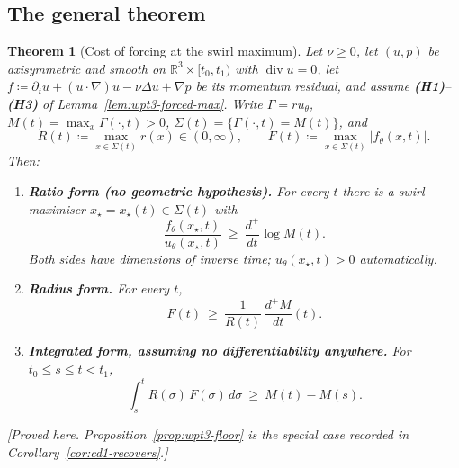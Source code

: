 \documentclass[11pt]{article}
\newtheorem{theorem}{Theorem}[section]
\theoremstyle{definition}
\theoremstyle{remark}
\newcommand{\R}{\mathbb{R}}
\newcommand{\abs}[1]{\left|#1\right|}
\newcommand{\grad}{\nabla}
\newcommand{\divg}{\operatorname{div}}
\begin{document}
\subsection{The general theorem}
\label{subsec:cd1-theorem}

\begin{theorem}[Cost of forcing at the swirl maximum]
  \label{thm:cd1-general-floor}
  Let $\nu\geq0$, let $(u,p)$ be axisymmetric and smooth on
  $\R^3\times[t_0,t_1)$ with $\divg u=0$, let
  $f\coloneqq\partial_tu+(u\cdot\grad)u-\nu\Delta u+\grad p$ be its momentum
  residual, and assume \textbf{(H1)}--\textbf{(H3)} of
  Lemma~\ref{lem:wpt3-forced-max}. Write $\Gamma=ru_\theta$,
  $M(t)=\max_x\Gamma(\cdot,t)>0$, $\Sigma(t)=\{\Gamma(\cdot,t)=M(t)\}$, and
  \begin{equation}\label{eq:cd1-RF}
    R(t)\coloneqq\max_{x\in\Sigma(t)}r(x)\in(0,\infty),
    \qquad
    F(t)\coloneqq\max_{x\in\Sigma(t)}\abs{f_\theta(x,t)} .
  \end{equation}
  Then:
  \begin{enumerate}[label=\textup{(\roman*)},leftmargin=2.6em]
    \item\label{it:cd1-ratio} \textbf{Ratio form (no geometric hypothesis).}
      For every $t$ there is a swirl maximiser $x_\star=x_\star(t)\in\Sigma(t)$
      with
      \begin{equation}\label{eq:cd1-ratio}
        \frac{f_\theta(x_\star,t)}{u_\theta(x_\star,t)}
        \ \geq\ \frac{d^{+}}{dt}\log M(t) .
      \end{equation}
      Both sides have dimensions of inverse time; $u_\theta(x_\star,t)>0$
      automatically.
    \item\label{it:cd1-radius} \textbf{Radius form.} For every $t$,
      \begin{equation}\label{eq:cd1-radius}
        F(t)\ \geq\ \frac{1}{R(t)}\,\frac{d^{+}M}{dt}(t) .
      \end{equation}
    \item\label{it:cd1-int} \textbf{Integrated form, assuming no
      differentiability anywhere.} For $t_0\leq s\leq t<t_1$,
      \begin{equation}\label{eq:cd1-int}
        \int_s^t R(\sigma)\,F(\sigma)\,d\sigma\ \geq\ M(t)-M(s).
      \end{equation}
  \end{enumerate}
  \emph{[Proved here. Proposition~\ref{prop:wpt3-floor} is the special case
  recorded in Corollary~\ref{cor:cd1-recovers}.]}
\end{theorem}
\end{document}
